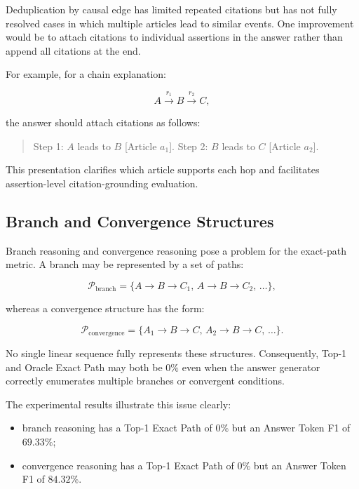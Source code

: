 Deduplication by causal edge has limited repeated citations but has not fully
resolved cases in which multiple articles lead to similar events. One
improvement would be to attach citations to individual assertions in the
answer rather than append all citations at the end.

For example, for a chain explanation:

\[
A \xrightarrow{r_1} B \xrightarrow{r_2} C,
\]

the answer should attach citations as follows:

\begin{quote}
Step 1: \(A\) leads to \(B\) [Article \(a_1\)].
Step 2: \(B\) leads to \(C\) [Article \(a_2\)].
\end{quote}

This presentation clarifies which article supports each hop and facilitates
assertion-level citation-grounding evaluation.

\subsection{Branch and Convergence Structures}

Branch reasoning and convergence reasoning pose a problem for the exact-path
metric. A branch may be represented by a set of paths:

\[
\mathcal{P}_{\mathrm{branch}}
=
\{
A \rightarrow B \rightarrow C_1,\,
A \rightarrow B \rightarrow C_2,\,
\ldots
\},
\]

whereas a convergence structure has the form:

\[
\mathcal{P}_{\mathrm{convergence}}
=
\{
A_1 \rightarrow B \rightarrow C,\,
A_2 \rightarrow B \rightarrow C,\,
\ldots
\}.
\]

No single linear sequence fully represents these structures. Consequently,
Top-1 and Oracle Exact Path may both be \(0\%\) even when the answer
generator correctly enumerates multiple branches or convergent conditions.

The experimental results illustrate this issue clearly:

\begin{itemize}
    \item branch reasoning has a Top-1 Exact Path of \(0\%\) but an Answer
    Token F1 of \(69.33\%\);

    \item convergence reasoning has a Top-1 Exact Path of \(0\%\) but an
    Answer Token F1 of \(84.32\%\).
\end{itemize}

